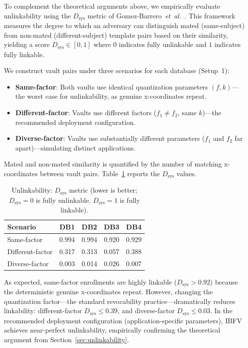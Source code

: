 \documentclass[conference]{IEEEtran}
\newcommand{\IBFV}{\textsf{IBFV}}
\begin{document}
To complement the theoretical arguments above, we empirically evaluate unlinkability using the $D_{\text{sys}}$ metric of Gomez-Barrero~\textit{et~al.}~\cite{gomezbarrero2017}. This framework measures the degree to which an adversary can distinguish mated (same-subject) from non-mated (different-subject) template pairs based on their similarity, yielding a score $D_{\text{sys}} \in [0, 1]$ where $0$ indicates fully unlinkable and $1$ indicates fully linkable.

We construct vault pairs under three scenarios for each database (Setup~1):
\begin{itemize}
    \item \textbf{Same-factor}: Both vaults use identical quantization parameters $(f, k)$---the worst case for unlinkability, as genuine x-coordinates repeat.
    \item \textbf{Different-factor}: Vaults use different factors ($f_1 \neq f_2$, same $k$)---the recommended deployment configuration.
    \item \textbf{Diverse-factor}: Vaults use substantially different parameters ($f_1$ and $f_2$ far apart)---simulating distinct applications.
\end{itemize}

Mated and non-mated similarity is quantified by the number of matching x-coordinates between vault pairs. Table~\ref{tab:dsys} reports the $D_{\text{sys}}$ values.

\begin{table}[t]
\centering
\caption{Unlinkability: $D_{\text{sys}}$ metric (lower is better; $D_{\text{sys}} = 0$ is fully unlinkable, $D_{\text{sys}} = 1$ is fully linkable).}
\label{tab:dsys}
\begin{tabular}{@{}l c c c c@{}}
\toprule
\textbf{Scenario} & \textbf{DB1} & \textbf{DB2} & \textbf{DB3} & \textbf{DB4} \\
\midrule
Same-factor     & 0.994 & 0.994 & 0.920 & 0.929 \\
Different-factor & 0.317 & 0.313 & 0.057 & 0.388 \\
Diverse-factor   & 0.003 & 0.014 & 0.026 & 0.007 \\
\bottomrule
\end{tabular}
\end{table}

As expected, same-factor enrollments are highly linkable ($D_{\text{sys}} > 0.92$) because the deterministic genuine x-coordinates repeat. However, changing the quantization factor---the standard revocability practice---dramatically reduces linkability: different-factor $D_{\text{sys}} \leq 0.39$, and diverse-factor $D_{\text{sys}} \leq 0.03$. In the recommended deployment configuration (application-specific parameters), \IBFV{} achieves near-perfect unlinkability, empirically confirming the theoretical argument from Section~\ref{sec:unlinkability}.
\end{document}
